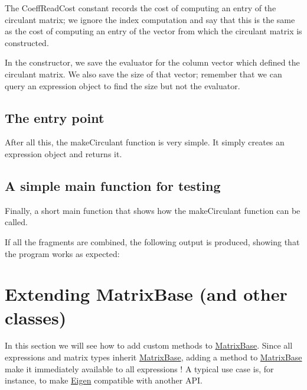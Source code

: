 The {\ttfamily Coeff\+Read\+Cost} constant records the cost of computing an entry of the circulant matrix; we ignore the index computation and say that this is the same as the cost of computing an entry of the vector from which the circulant matrix is constructed.

In the constructor, we save the evaluator for the column vector which defined the circulant matrix. We also save the size of that vector; remember that we can query an expression object to find the size but not the evaluator.


\begin{DoxyCodeInclude}
\end{DoxyCodeInclude}
\hypertarget{_topic_new_expression_type_TopicEntry}{}\subsection{The entry point}\label{_topic_new_expression_type_TopicEntry}
After all this, the {\ttfamily make\+Circulant} function is very simple. It simply creates an expression object and returns it.


\begin{DoxyCodeInclude}
\end{DoxyCodeInclude}
\hypertarget{_topic_new_expression_type_TopicMain}{}\subsection{A simple main function for testing}\label{_topic_new_expression_type_TopicMain}
Finally, a short {\ttfamily main} function that shows how the {\ttfamily make\+Circulant} function can be called.


\begin{DoxyCodeInclude}
\end{DoxyCodeInclude}


If all the fragments are combined, the following output is produced, showing that the program works as expected\+:


\begin{DoxyCodeInclude}
\end{DoxyCodeInclude}
 \hypertarget{TopicCustomizing_Plugins}{}\section{Extending Matrix\+Base (and other classes)}\label{TopicCustomizing_Plugins}
In this section we will see how to add custom methods to \hyperlink{group___core___module_class_eigen_1_1_matrix_base}{Matrix\+Base}. Since all expressions and matrix types inherit \hyperlink{group___core___module_class_eigen_1_1_matrix_base}{Matrix\+Base}, adding a method to \hyperlink{group___core___module_class_eigen_1_1_matrix_base}{Matrix\+Base} make it immediately available to all expressions ! A typical use case is, for instance, to make \hyperlink{namespace_eigen}{Eigen} compatible with another A\+PI.


